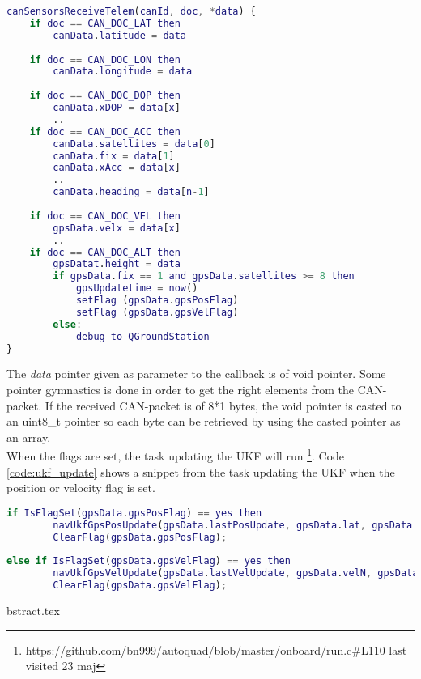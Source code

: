 \begin{lstlisting}[language = Matlab, caption = Modified callback invoked when a sensor-value is received. Shows how doc is used to tell which GPS\-packet is received and when height is received the flags are set, label=code:psudo_parse_can_gps]
canSensorsReceiveTelem(canId, doc, *data) {
	if doc == CAN_DOC_LAT then
		canData.latitude = data
		
	if doc == CAN_DOC_LON then
		canData.longitude = data
		
	if doc == CAN_DOC_DOP then
		canData.xDOP = data[x]
		..
	if doc == CAN_DOC_ACC then
		canData.satellites = data[0]
		canData.fix = data[1]
		canData.xAcc = data[x]
		..
		canData.heading = data[n-1]
		
	if doc == CAN_DOC_VEL then
		gpsData.velx = data[x]
		..		
	if doc == CAN_DOC_ALT then
		gpsDatat.height = data
		if gpsData.fix == 1 and gpsData.satellites >= 8 then
			gpsUpdatetime = now()
			setFlag (gpsData.gpsPosFlag)
			setFlag (gpsData.gpsVelFlag)
		else:
			debug_to_QGroundStation
}
\end{lstlisting}

The \textit{data} pointer given as parameter to the callback is of void pointer. Some pointer gymnastics is done in order to get the right elements from the CAN-packet. If the received CAN-packet is of 8*1 bytes, the void pointer is casted to an uint8\_t pointer so each byte can be retrieved by using the casted pointer as an array. \\

When the flags are set, the task updating the UKF will run \footnote{\url{https://github.com/bn999/autoquad/blob/master/onboard/run.c\#L110} last visited 23 maj}.
Code \ref{code:ukf_update} shows a snippet from the task updating the UKF when the position or velocity flag is set.
\begin{lstlisting}[language = Matlab, caption = Snippet of run.c as psudeocode which updates the UKF when position flag or velocity flag is set, label=code:ukf_update]
if IsFlagSet(gpsData.gpsPosFlag) == yes then
	    navUkfGpsPosUpdate(gpsData.lastPosUpdate, gpsData.lat, gpsData.lon, gpsData.height, ....);
	    ClearFlag(gpsData.gpsPosFlag);
	    
else if IsFlagSet(gpsData.gpsVelFlag) == yes then
	    navUkfGpsVelUpdate(gpsData.lastVelUpdate, gpsData.velN, gpsData.velE, ....);
	    ClearFlag(gpsData.gpsVelFlag);
\end{lstlisting}
bstract.tex
